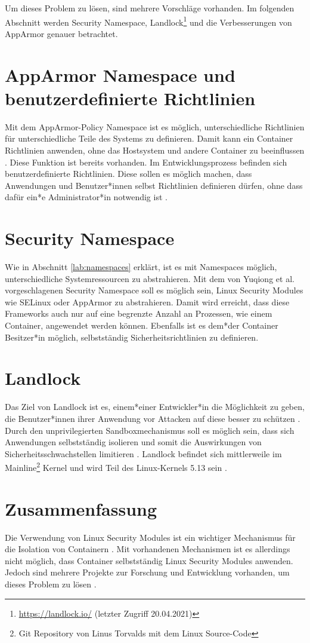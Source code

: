 Um dieses Problem zu lösen, sind mehrere Vorschläge vorhanden. Im folgenden
Abschnitt werden Security Namespace,
Landlock\footnote{\url{https://landlock.io/} (letzter Zugriff 20.04.2021)} und
die Verbesserungen von AppArmor genauer betrachtet. 

\section{AppArmor Namespace und benutzerdefinierte Richtlinien}
Mit dem AppArmor-Policy Namespace ist es möglich, unterschiedliche Richtlinien
für unterschiedliche Teile des Systems zu definieren. Damit kann ein Container
Richtlinien anwenden, ohne das Hostsystem und andere Container zu beeinflussen
\cite{apparmor_namespace}. Diese Funktion ist bereits vorhanden. Im
Entwicklungsprozess befinden sich benutzerdefinierte Richtlinien. Diese sollen
es möglich machen, dass Anwendungen und Benutzer*innen selbst Richtlinien definieren
dürfen, ohne dass dafür ein*e Administrator*in notwendig ist \cite{apparmor_slides}
\cite{apparmor_userdefined}.

\section{Security Namespace}
Wie in Abschnitt \ref{lab:namespaces} erklärt, ist es mit Namespaces möglich,
unterschiedliche Systemressourcen zu abstrahieren. Mit dem von Yuqiong et al.
\cite{SecurityNamespace} vorgeschlagenen Security Namespace soll es möglich
sein, Linux Security Modules wie SELinux oder AppArmor zu abstrahieren. Damit
wird erreicht, dass diese Frameworks auch nur auf eine begrenzte Anzahl an
Prozessen, wie einem Container, angewendet werden können. Ebenfalls ist es dem*der
Container Besitzer*in möglich, selbstständig Sicherheitsrichtlinien zu definieren.

\section{Landlock}
Das Ziel von Landlock ist es, einem*einer Entwickler*in die Möglichkeit zu geben, die
Benutzer*innen ihrer Anwendung vor Attacken auf diese besser zu schützen
\cite{lwn_landlock}. Durch den unprivilegierten Sandboxmechanismus soll es
möglich sein, dass sich Anwendungen selbstständig isolieren und somit die
Auswirkungen von Sicherheitsschwachstellen limitieren
\cite{Landlock_commit_kernel}. Landlock befindet sich mittlerweile im
Mainline\footnote{Git Repository von Linus Torvalds mit dem Linux Source-Code}
Kernel und wird Teil des Linux-Kernels 5.13 sein
\cite{Landlock_merge_mainline}.

\section{Zusammenfassung}
Die Verwendung von Linux Security Modules ist ein wichtiger Mechanismus für die
Isolation von Containern \cite{10.1145/3274694.3274720}. Mit vorhandenen
Mechanismen ist es allerdings nicht möglich, dass Container selbstständig Linux
Security Modules anwenden. Jedoch sind mehrere Projekte zur Forschung und
Entwicklung vorhanden, um dieses Problem zu lösen \cite{Landlock}
\cite{SecurityNamespace} \cite{apparmor_slides}.
